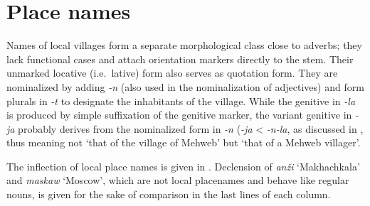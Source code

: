 ﻿\documentclass[output=paper]{langsci/langscibook}
\begin{document}
\section{Place names}

Names of local villages form a separate morphological class close to
adverbs; they lack functional cases and attach orientation markers
directly to the stem. Their unmarked locative (i.e.\ lative) form also
serves as quotation form. They are nominalized by adding \emph{-n} (also
used in the nominalization of adjectives) and form plurals in \emph{-t} to
designate the inhabitants of the village. While the genitive in
\emph{-la} is produced by simple suffixation of the genitive marker, the
variant genitive in \emph{-ja} probably derives from the nominalized
form in \emph{-n} (\emph{-ja} \textless{} \emph{-n-la}, as discussed in
\citet{moroz2019}, thus meaning not `that of the village of Mehweb' but `that
of a Mehweb villager'.

{The inflection of local place names is given in . Declension
of \emph{anži} `Ma\-khach\-kala' and \emph{maskaw} `Moscow', which are not
local placenames and behave like regular nouns, is given for the sake of
comparison in the last lines of each column.}
\end{document}
